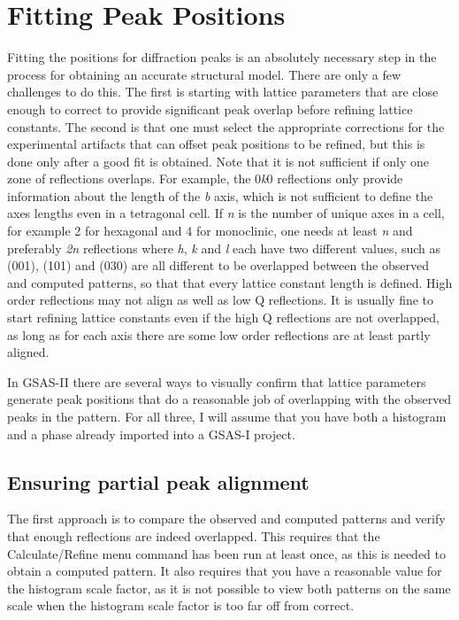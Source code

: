 \chapter{Fitting Peak Positions}
\label{Chap:peakpositions}

Fitting the positions for diffraction peaks is an absolutely necessary step in the process for obtaining an accurate structural model. There are only a few challenges to do this. The first is starting with lattice parameters that are close enough to correct to provide significant peak overlap before refining lattice constants. 
The second is that one must select the appropriate corrections for the experimental artifacts that can offset peak positions to be refined, but this is done only after a good fit is obtained. 
Note that it is not sufficient if only one zone of reflections overlaps. For example, the 0\textit{k}0 reflections only provide information about the length of the \textit{b} axis, which is not sufficient to define the axes lengths even in a tetragonal cell. If \textit{n} is the number of unique axes in a cell, for example 2 for hexagonal and 4 for monoclinic, one needs at least \textit{n} and preferably \textit{2n} reflections where \textit{h}, \textit{k} and \textit{l} each have two different values, such as (001), (101) and (030) are all different to be overlapped between the observed and computed patterns, so that that every lattice constant length is defined. High order reflections may not align as well as low Q reflections. It is usually fine to start refining lattice constants even if the high Q reflections are not overlapped, as long as for each axis there are some low order reflections are at least partly aligned. 

In GSAS-II there are several ways to visually confirm that lattice parameters generate peak positions that do a reasonable job of overlapping with the observed peaks in the pattern. For all three, I will assume that you have both a histogram and a phase already imported into a GSAS-I project. 

\section{Ensuring partial peak alignment}

The first approach is to compare the observed and computed patterns and verify that enough reflections are indeed overlapped. This requires that the Calculate/Refine menu command has been run at least once, as this is needed to obtain a computed pattern. It also requires that you have a reasonable value for the histogram scale factor, as it is not possible to view both patterns on the same scale when the histogram scale factor is too far off from correct. 

